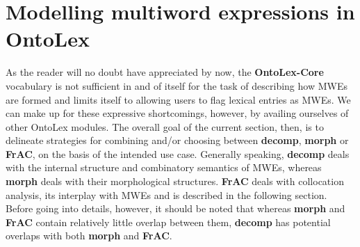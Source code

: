 \documentclass[output=paper,colorlinks,citecolor=brown]{langscibook}
\begin{document}



\section{Modelling multiword expressions in OntoLex} %

As the reader will no doubt have appreciated by now, the \textbf{OntoLex-Core} vocabulary is not sufficient in and of itself for the task of describing how MWEs are formed and limits itself to allowing users to flag lexical entries as MWEs. We can make up for these expressive shortcomings, however, by availing ourselves of other OntoLex modules. The overall goal of the current section, then, is to delineate strategies for combining and/or choosing between \textbf{decomp}, \textbf{morph} or \textbf{FrAC}, on the basis of the intended use case.  Generally speaking, \textbf{decomp} deals with the internal structure and combinatory semantics of MWEs, whereas \textbf{morph} deals with their morphological structures. \textbf{FrAC} deals with collocation analysis, its interplay with MWEs and is described in the following section. Before going into details, however, it should be noted that whereas \textbf{morph} and \textbf{FrAC} contain relatively little overlap between them, \textbf{decomp} has potential overlaps with both \textbf{morph} and \textbf{FrAC}.
\end{document}
